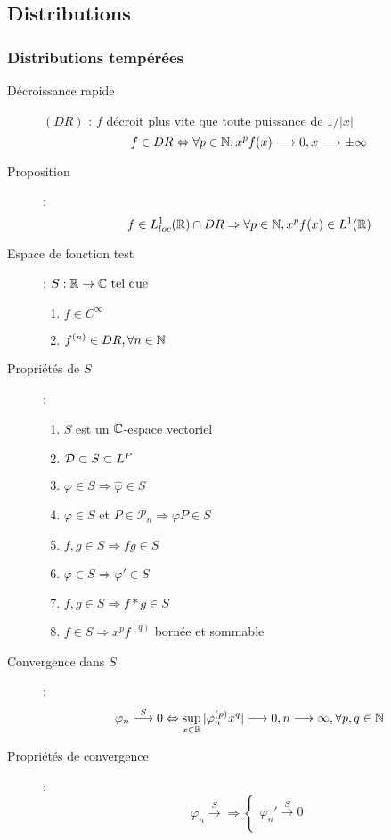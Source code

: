 \subsection{Distributions}
\subsubsection{Distributions tempérées}
\begin{description}
\item[Décroissance rapide] $(DR)$ : $f$ décroit plus vite que toute puissance de $1/|x|$
    \[ f\in DR\Leftrightarrow\forall p\in\mathbb{N},x^pf(x)\longrightarrow 0, x\longrightarrow\pm\infty \]
\item[Proposition] :
    \[ f\in L^1_{loc}(\mathbb{R})\cap DR\Rightarrow
    \forall p\in\mathbb{N},x^pf(x)\in L^1(\mathbb{R}) \]
\item[Espace de fonction test] : $S:\mathbb{R}\rightarrow\mathbb{C}\textrm{ tel que }$
\begin{enumerate}
    \item $f\in C^\infty$
    \item $f^{(n)}\in DR, \forall n\in\mathbb{N}$
\end{enumerate}
\item[Propriétés de $S$] :
\begin{enumerate}
    \item $S$ est un $\mathbb{C}$-espace vectoriel
    \item $\mathcal{D}\subset S\subset L^P$
    \item $\varphi\in S\Rightarrow \hat\varphi\in S$
    \item $\varphi\in S$ et $P\in\mathcal P_n\Rightarrow\varphi P\in S$
    \item $f,g\in S\Rightarrow fg\in S$
    \item $\varphi\in S\Rightarrow\varphi'\in S$
    \item $f,g\in S\Rightarrow f*g\in S$
    \item $f\in S\Rightarrow x^pf^{(q)}$ bornée et sommable
\end{enumerate}
\item[Convergence dans $S$] :
    \[
        \varphi_n\overset{S}{\longrightarrow}0
        \Leftrightarrow
        \sup_{x\in\mathbb{R}}|\varphi_n^{(p)}x^q|\longrightarrow 0,
        n\longrightarrow\infty,
        \forall p,q\in\mathbb{N}
    \]
\item[Propriétés de convergence] :
    \[
        \varphi_n\overset{S}{\longrightarrow}
        \Rightarrow
        \begin{cases}
            \varphi_n'\overset{S}{\longrightarrow}0\\

\end{cases}\]
\end{description}
